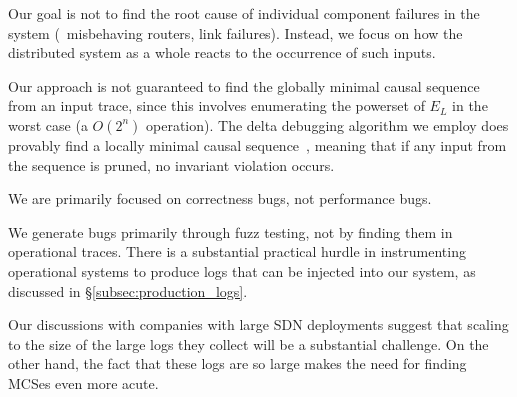 

 Our goal is not to find the root
cause of individual component failures in the system (\eg~misbehaving routers,
link failures). Instead, we focus on
how the distributed system as a whole reacts to the occurrence of such inputs.

Our approach is not guaranteed to find the globally minimal
causal sequence from an input trace, since this involves enumerating the powerset of
$E_L$ in the worst case (a $O(2^n)$ operation).
The delta debugging algorithm we employ does provably find a
locally minimal causal sequence~\cite{Zeller:1999:YMP:318773.318946},
meaning that if any input from the sequence is pruned, no invariant violation
occurs.

We are primarily focused on correctness bugs, not performance bugs.

We generate bugs primarily through fuzz testing, not by finding them in
operational traces. There is a substantial practical hurdle in instrumenting
operational systems to produce logs that can be injected into our system, as
discussed in \S\ref{subsec:production_logs}.

Our discussions with companies with large SDN deployments suggest that scaling to the size of the
large logs they collect will be a substantial challenge.
On the other hand, the fact that these logs are so large makes the need for finding MCSes even more acute.


